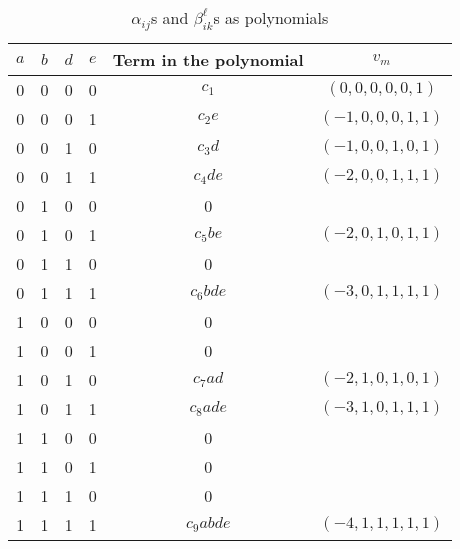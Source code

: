 \begin{table}[t]
	\centering
	\begin{tabular}{|c c c c c c|}
		\hline 
		$a$ & $b$ & $d$ & $e$ & Term in the polynomial & $v_m$ \\
		\hline
		0 & 0 & 0 & 0 & $c_1$     & $(0,0,0,0,0,1)$ \\
		0 & 0 & 0 & 1 & $c_2e$    & $(-1,0,0,0,1,1)$ \\
		0 & 0 & 1 & 0 & $c_3d$    & $(-1,0,0,1,0,1)$ \\
		0 & 0 & 1 & 1 & $c_4de$   & $(-2,0,0,1,1,1)$ \\
		0 & 1 & 0 & 0 & 0         & \\
		0 & 1 & 0 & 1 & $c_5be$   & $(-2,0,1,0,1,1)$ \\
		0 & 1 & 1 & 0 & 0         & \\
		0 & 1 & 1 & 1 & $c_6bde$  & $(-3,0,1,1,1,1)$\\
		1 & 0 & 0 & 0 & 0         & \\
		1 & 0 & 0 & 1 & 0         & \\
		1 & 0 & 1 & 0 & $c_7ad$   & $(-2,1,0,1,0,1)$\\
		1 & 0 & 1 & 1 & $c_8ade$  & $(-3,1,0,1,1,1)$\\
		1 & 1 & 0 & 0 & 0         & \\
		1 & 1 & 0 & 1 & 0         & \\
		1 & 1 & 1 & 0 & 0         & \\
		1 & 1 & 1 & 1 & $c_9abde$ & $(-4,1,1,1,1,1)$ \\
		\hline
	\end{tabular}
	\caption{$\alpha_{ij}$s and $\beta_{ik}^\ell$s as polynomials}
	\label{tab:reducedPolynomial}
\end{table}